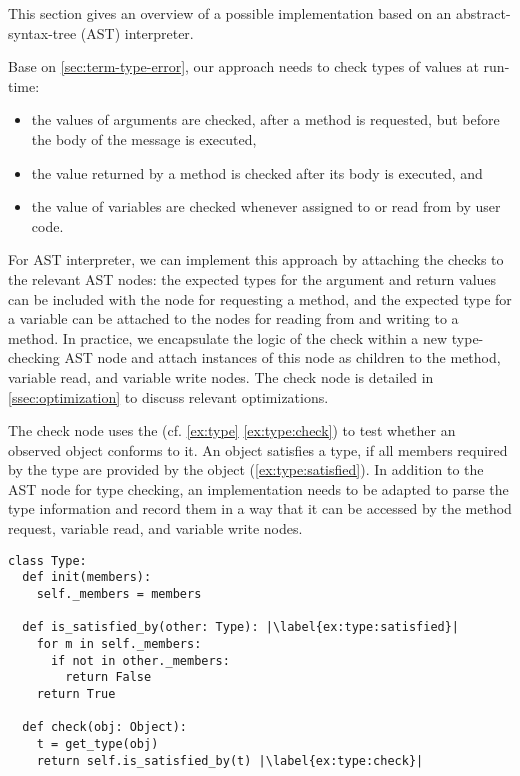 This section gives an overview of a possible implementation
based on an abstract-syntax-tree (AST) interpreter.

Base on \cref{sec:term-type-error},
our approach needs to check types of values at run-time:

\begin{itemize}
\item the values of arguments are checked, after a method is requested, 
      but before the body of the message is executed,
\item the value returned by a method is checked after its body is executed, and
\item the value of variables are checked
      whenever assigned to or read from by user code.
\end{itemize}

For AST interpreter,
we can implement this approach by attaching the checks to the relevant AST nodes:
the expected types for the argument and return values can be included
with the node for requesting a method, and the expected type for a variable
can be attached to the nodes for reading from and writing to a method.
In practice,
we encapsulate the logic of the check within a new type-checking AST node
and attach instances of this node as children to the method,
variable read, and variable write nodes. 
The check node is detailed in \cref{ssec:optimization} to discuss relevant
optimizations.

The check node uses the  (cf. \cref{ex:type} \cref{ex:type:check}) to test whether an observed
object conforms to it.
An object satisfies a type, if all members required by the type are provided
by the object (\cref{ex:type:satisfied}).
In addition to the AST node for type checking,
an implementation needs to be adapted to parse the type information
and record them in a way that it can be accessed by the
method request, variable read, and variable write nodes.


\begin{lstlisting}[label={ex:type},escapechar=|,caption={Sketch of a \code{Type} in our system and its \code{check()} semantics.},float,floatplacement=htb]
class Type:
  def init(members):
    self._members = members

  def is_satisfied_by(other: Type): |\label{ex:type:satisfied}|
    for m in self._members:
      if not in other._members:
        return False
    return True

  def check(obj: Object):
    t = get_type(obj)
    return self.is_satisfied_by(t) |\label{ex:type:check}|
\end{lstlisting}


